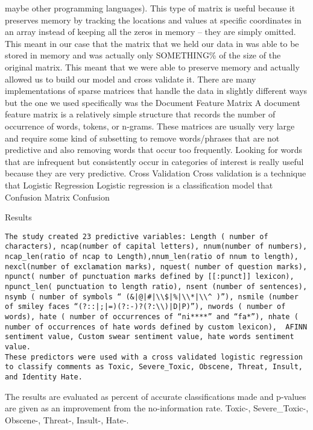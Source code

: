 \documentclass[]{article}
\begin{document}
maybe other programming languages). This type of matrix is useful
because it preserves memory by tracking the locations and values at
specific coordinates in an array instead of keeping all the zeros in
memory -- they are simply omitted. This meant in our case that the
matrix that we held our data in was able to be stored in memory and was
actually only SOMETHING\% of the size of the original matrix. This meant
that we were able to preserve memory and actually allowed us to build
our model and cross validate it. There are many implementations of
sparse matrices that handle the data in slightly different ways but the
one we used specifically was the Document Feature Matrix A document
feature matrix is a relatively simple structure that records the number
of occurrence of words, tokens, or n-grams. These matrices are usually
very large and require some kind of subsetting to remove words/phrases
that are not predictive and also removing words that occur too
frequently. Looking for words that are infrequent but consistently occur
in categories of interest is really useful because they are very
predictive. Cross Validation Cross validation is a technique that
Logistic Regression Logistic regression is a classification model that
Confusion Matrix Confusion

Results

\begin{verbatim}
The study created 23 predictive variables: Length ( number of characters), ncap(number of capital letters), nnum(number of numbers), ncap_len(ratio of ncap to Length),nnum_len(ratio of nnum to length), nexcl(number of exclamation marks), nquest( number of question marks), npunct( number of punctuation marks defined by [[:punct]] lexicon), npunct_len( punctuation to length ratio), nsent (number of sentences), nsymb ( number of symbols “ (&|@|#|\\$|%|\\*|\\^ )”), nsmile (number of smiley faces “(?::|;|=)(?:-)?(?:\\)|D|P)”), nwords ( number of words), hate ( number of occurrences of “ni****” and “fa*”), nhate ( number of occurrences of hate words defined by custom lexicon),  AFINN sentiment value, Custom swear sentiment value, hate words sentiment value.
These predictors were used with a cross validated logistic regression to classify comments as Toxic, Severe_Toxic, Obscene, Threat, Insult, and Identity Hate.
\end{verbatim}

The results are evaluated as percent of accurate classifications made
and p-values are given as an improvement from the no-information rate.
Toxic-, Severe\_Toxic-, Obscene-, Threat-, Insult-, Hate-.
\end{document}
